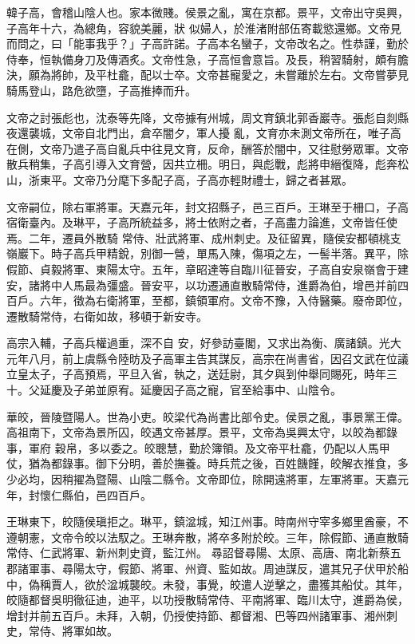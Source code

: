 \begin{pinyinscope}
 韓子高，會稽山陰人也。家本微賤。侯景之亂，寓在京都。景平，文帝出守吳興，子高年十六，為總角，容貌美麗，狀
 似婦人，於淮渚附部伍寄載慾還鄉。文帝見而問之，曰「能事我乎？」子高許諾。子高本名蠻子，文帝改名之。性恭謹，勤於侍奉，恒執備身刀及傳酒炙。文帝性急，子高恒會意旨。及長，稍習騎射，頗有膽決，願為將帥，及平杜龕，配以士卒。文帝甚寵愛之，未嘗離於左右。文帝嘗夢見騎馬登山，路危欲墮，子高推捧而升。



 文帝之討張彪也，沈泰等先降，文帝據有州城，周文育鎮北郭香巖寺。張彪自剡縣夜還襲城，文帝自北門出，倉卒闇夕，軍人擾
 亂，文育亦未測文帝所在，唯子高在側，文帝乃遣子高自亂兵中往見文育，反命，酬答於闇中，又往慰勞眾軍。文帝散兵稍集，子高引導入文育營，因共立柵。明日，與彪戰，彪將申縉復降，彪奔松山，浙東平。文帝乃分麾下多配子高，子高亦輕財禮士，歸之者甚眾。



 文帝嗣位，除右軍將軍。天嘉元年，封文招縣子，邑三百戶。王琳至于柵口，子高宿衛臺內。及琳平，子高所統益多，將士依附之者，子高盡力論進，文帝皆任使焉。二年，遷員外散騎
 常侍、壯武將軍、成州刺史。及征留異，隨侯安都頓桃支嶺巖下。時子高兵甲精銳，別御一營，單馬入陳，傷項之左，一髻半落。異平，除假節、貞毅將軍、東陽太守。五年，章昭達等自臨川征晉安，子高自安泉嶺會于建安，諸將中人馬最為彊盛。晉安平，以功遷通直散騎常侍，進爵為伯，增邑并前四百戶。六年，徵為右衛將軍，至都，鎮領軍府。文帝不豫，入侍醫藥。廢帝即位，遷散騎常侍，右衛如故，移頓于新安寺。



 高宗入輔，子高兵權過重，深不自
 安，好參訪臺閣，又求出為衡、廣諸鎮。光大元年八月，前上虞縣令陸昉及子高軍主告其謀反，高宗在尚書省，因召文武在位議立皇太子，子高預焉，平旦入省，執之，送廷尉，其夕與到仲舉同賜死，時年三十。父延慶及子弟並原宥。延慶因子高之寵，官至給事中、山陰令。



 華皎，晉陵暨陽人。世為小吏。皎梁代為尚書比部令史。侯景之亂，事景黨王偉。高祖南下，文帝為景所囚，皎遇文帝甚厚。景平，文帝為吳興太守，以皎為都錄事，軍府
 穀帛，多以委之。皎聰慧，勤於簿領。及文帝平杜龕，仍配以人馬甲仗，猶為都錄事。御下分明，善於撫養。時兵荒之後，百姓饑饉，皎解衣推食，多少必均，因稍擢為暨陽、山陰二縣令。文帝即位，除開遠將軍，左軍將軍。天嘉元年，封懷仁縣伯，邑四百戶。



 王琳東下，皎隨侯瑱拒之。琳平，鎮湓城，知江州事。時南州守宰多鄉里酋豪，不遵朝憲，文帝令皎以法馭之。王琳奔散，將卒多附於皎。三年，除假節、通直散騎常侍、仁武將軍、新州刺史資，監江州。
 尋詔督尋陽、太原、高唐、南北新蔡五郡諸軍事、尋陽太守，假節、將軍、州資、監如故。周迪謀反，遣其兄子伏甲於船中，偽稱賈人，欲於湓城襲皎。未發，事覺，皎遣人逆擊之，盡獲其船仗。其年，皎隨都督吳明徹征迪，迪平，以功授散騎常侍、平南將軍、臨川太守，進爵為侯，增封并前五百戶。未拜，入朝，仍授使持節、都督湘、巴等四州諸軍事、湘州刺史，常侍、將軍如故。




\end{pinyinscope}
